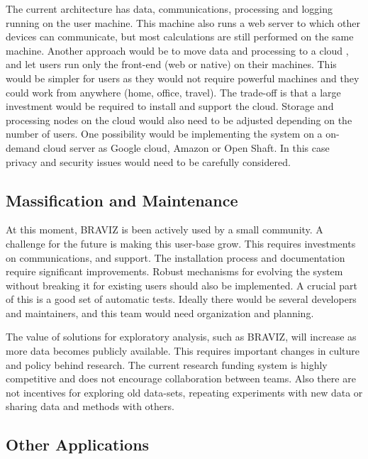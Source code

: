 The current architecture has data, communications, processing and logging running on the user machine. This machine also runs a web server to  which other devices can communicate, but most calculations are still performed on the same machine. Another approach would be to move data and processing to a cloud , and let users run only the front-end (web or native) on their machines. This would be simpler for users as they would not require powerful machines and they could work from anywhere (home, office, travel). The trade-off is that a large investment would be required  to install and support the cloud. Storage and processing nodes on the cloud would also need to be adjusted depending on the number of users. One possibility would be implementing the system on a on-demand cloud server as Google cloud, Amazon or Open Shaft. In this case privacy and security issues would need to be carefully considered. 


\subsection{Massification and Maintenance}

At this moment, BRAVIZ is been actively used by a small community. A challenge for the future is making this user-base grow. This requires investments on communications, and support. The installation process and documentation require significant improvements. Robust mechanisms for evolving the system without breaking it for existing users should also be implemented. A crucial part of this is a good set of automatic tests. Ideally there would be several developers and maintainers, and this team would need organization and planning.

The value of solutions for exploratory analysis, such as BRAVIZ, will increase as more data becomes publicly available. This requires important changes in  culture and policy behind research. The current research funding system is highly competitive and does not encourage collaboration between teams. Also there are not incentives for exploring old data-sets, repeating experiments with new data or sharing data and methods with others. 


\subsection{Other Applications}

